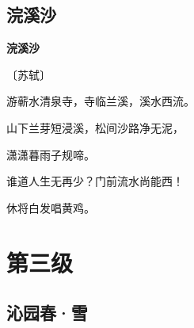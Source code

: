 \documentclass[12pt,UTF-8,openany,fontset=none]{ctexbook}
\begin{document}
\vspace{8pt}
\clearpage

\section{浣溪沙}


\begin{center}
    {\bfseries 浣溪沙}

    \vspace{18pt}

    \begin{large}\xuwen
        〔苏轼〕
    \end{large}

\end{center}

    \vspace{12pt}\mbox{}

    \begin{large}\xuwen
        游蕲水清泉寺，寺临兰溪，溪水西流。
    \end{large}


    \vspace{8pt}

\begin{center}
    \begin{Large}

        山下兰芽短浸溪，松间沙路净无泥，

        潇潇暮雨子规啼。

        \vspace{18pt}  %

        谁道人生无再少？门前流水尚能西！

        休将白发唱黄鸡。

    \end{Large}

\end{center}

\vspace{8pt}
\clearpage

\chapter{第三级}
\clearpage

\section{沁园春·雪}

\end{document}
